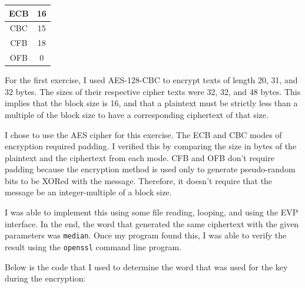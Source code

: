 \documentclass[12pt,largemargins]{homework}
\newcommand{\code}{\texttt}
\begin{document}
\begin{center}
    \begin{tabular}{|c|c|}\hline
        ECB & 16 \\\hline
        CBC & 15 \\\hline
        CFB & 18 \\\hline
        OFB & 0  \\\hline
    \end{tabular}
\end{center}

\begin{arabicparts}
    \questionpart{} For the first exercise, I used AES-128-CBC to encrypt texts
    of length 20, 31, and 32 bytes. The sizes of their respective cipher texts
    were 32, 32, and 48 bytes. This implies that the block size is 16, and that
    a plaintext must be strictly less than a multiple of the block size to have
    a corresponding ciphertext of that size.

    \questionpart{} I chose to use the AES cipher for this exercise. The ECB
    and
    CBC modes of encryption required padding. I verified this by comparing the
    size in bytes of the plaintext and the ciphertext from each mode. CFB and
    OFB don't require padding because the encryption method is used only to
    generate pseudo-random bits to be XORed with the message. Therefore, it
    doesn't require that the message be an integer-multiple of a block size.
\end{arabicparts}

\clearpage
{}

I was able to implement this using some file reading, looping, and using the
EVP
interface. In the end, the word that generated the same ciphertext with the
given parameters was \code{median}. Once my program found this, I was able to
verify the result using the \code{openssl} command line program.

Below is the code that I used to determine the word that was used for the key
during the encryption:

\begin{center}
    \begin{minipage}{4.5in}

        
    \end{minipage}
\end{center}
\end{document}
